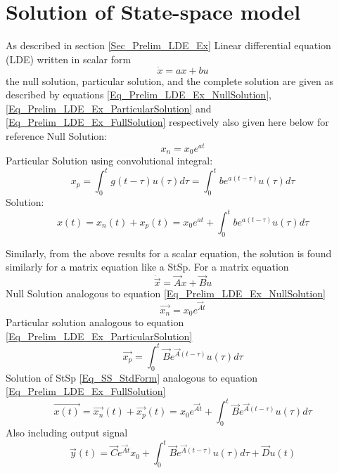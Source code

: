 \section{Solution of State-space model}

As described in section \ref{Sec_Prelim_LDE_Ex} Linear differential equation (LDE) written in scalar form \begin{equation}
	\dot{x} = a x + b u
\end{equation}
the null solution, particular solution, and the complete solution are given as described by equations \eqref{Eq_Prelim_LDE_Ex_NullSolution}, \eqref{Eq_Prelim_LDE_Ex_ParticularSolution} and \eqref{Eq_Prelim_LDE_Ex_FullSolution} respectively also given here below for reference
Null Solution:
\begin{equation}
	x_{n} = x_0 e^{at}
\end{equation}
Particular Solution using convolutional integral:
\begin{equation}
	x_p = \int_{0}^{t} g(t - \tau) u(\tau) d\tau = \int_{0}^{t} b e^{a(t - \tau)} u(\tau) d\tau
\end{equation}
Solution:
\begin{equation}
	x(t) = x_{n}(t) + x_{p}(t) = x_0 e^{at} + \int_{0}^{t} b e^{a(t - \tau)} u(\tau) d\tau
\end{equation}

Similarly, from the above results for a scalar equation, the solution is found similarly for a matrix equation like a StSp. For a matrix equation
\begin{equation}
	\dot{\vec{x}} = \vec{A}x + \vec{B}u
\end{equation}
Null Solution analogous to equation \ref{Eq_Prelim_LDE_Ex_NullSolution}
\begin{equation}
	\vec{x_{n}} = x_0 e^{\vec{A}t}
\end{equation}
Particular solution analogous to equation \ref{Eq_Prelim_LDE_Ex_ParticularSolution}
\begin{equation}
	\vec{x_p} = \int_{0}^{t} \vec{B} e^{\vec{A}(t - \tau)} u(\tau) d\tau
\end{equation}
Solution of StSp \eqref{Eq_SS_StdForm} analogous to equation \eqref{Eq_Prelim_LDE_Ex_FullSolution}
\begin{equation}
	\vec{x(t)} = \vec{x_{n}}(t) + \vec{x_{p}}(t) = x_0 e^{\vec{A}t} + \int_{0}^{t} \vec{B} e^{\vec{A}(t - \tau)} u(\tau) d\tau
\end{equation}
Also including output signal
\begin{equation} \label{Eq_StSp_SolutionFromLDE}
	\vec{y}(t) = \vec{C}e^{\vec{A}t}x_0 + \int_{0}^{t} \vec{B} e^{\vec{A}(t - \tau)} u(\tau) d\tau + \vec{D} u(t)
\end{equation}

